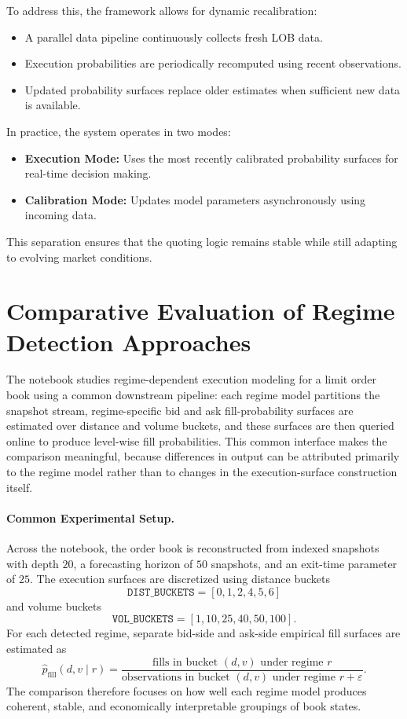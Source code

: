 \documentclass[12pt,a4paper]{report}
\begin{document}
To address this, the framework allows for dynamic recalibration:

\begin{itemize}
    \item A parallel data pipeline continuously collects fresh LOB data.
    \item Execution probabilities are periodically recomputed using recent observations.
    \item Updated probability surfaces replace older estimates when sufficient new data is available.
\end{itemize}

In practice, the system operates in two modes:

\begin{itemize}
    \item \textbf{Execution Mode:} Uses the most recently calibrated probability surfaces for real-time decision making.
    \item \textbf{Calibration Mode:} Updates model parameters asynchronously using incoming data.
\end{itemize}

This separation ensures that the quoting logic remains stable while still adapting to evolving market conditions.

\section{Comparative Evaluation of Regime Detection Approaches}

The notebook studies regime-dependent execution modeling for a limit order book using a common downstream pipeline: each regime model partitions the snapshot stream, regime-specific bid and ask fill-probability surfaces are estimated over distance and volume buckets, and these surfaces are then queried online to produce level-wise fill probabilities. This common interface makes the comparison meaningful, because differences in output can be attributed primarily to the regime model rather than to changes in the execution-surface construction itself.

\paragraph{Common Experimental Setup.}
Across the notebook, the order book is reconstructed from indexed snapshots with depth $20$, a forecasting horizon of $50$ snapshots, and an exit-time parameter of $25$. The execution surfaces are discretized using distance buckets
\[
\texttt{DIST\_BUCKETS} = [0,1,2,4,5,6]
\]
and volume buckets
\[
\texttt{VOL\_BUCKETS} = [1,10,25,40,50,100].
\]
For each detected regime, separate bid-side and ask-side empirical fill surfaces are estimated as
\[
\hat p_{\text{fill}}(d,v \mid r)
=
\frac{\text{fills in bucket }(d,v)\text{ under regime }r}
{\text{observations in bucket }(d,v)\text{ under regime }r + \varepsilon}.
\]
The comparison therefore focuses on how well each regime model produces coherent, stable, and economically interpretable groupings of book states.
\end{document}
